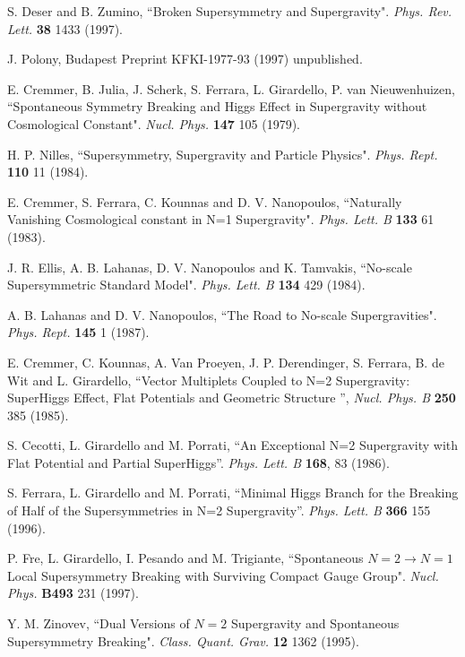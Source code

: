 \documentclass[a4paper,12pt]{article}
\begin{document}
\begin{thebibliography}{99}

 S. Deser and B. Zumino, ``Broken Supersymmetry and Supergravity". {\it Phys. Rev.
Lett.} {\bf 38} 1433 (1997).

 J. Polony, Budapest Preprint KFKI-1977-93 (1997) unpublished.

 E. Cremmer, B. Julia, J. Scherk, S. Ferrara, L. Girardello, P. van
Nieuwenhuizen, ``Spontaneous Symmetry Breaking and Higgs Effect in Supergravity without
Cosmological Constant". {\it Nucl. Phys.} {\bf 147} 105 (1979).


 H. P. Nilles, ``Supersymmetry, Supergravity and Particle Physics". {\it Phys.
Rept.} {\bf 110} 11 (1984).



E. Cremmer, S. Ferrara, C. Kounnas and D. V. Nanopoulos, ``Naturally Vanishing Cosmological
constant in N=1 Supergravity".
{\it Phys. Lett. B} {\bf 133} 61 (1983).

J. R. Ellis, A. B. Lahanas, D. V. Nanopoulos and K. Tamvakis, ``No-scale Supersymmetric
Standard Model". {\it  Phys. Lett. B }
{\bf 134} 429 (1984).

 A. B. Lahanas and D. V. Nanopoulos, ``The Road to No-scale Supergravities". {\it
Phys. Rept.} {\bf 145} 1 (1987).

E. Cremmer, C. Kounnas, A. Van Proeyen, J. P. Derendinger, S.
Ferrara, B. de Wit and L. Girardello, ``Vector Multiplets Coupled
to N=2 Supergravity: SuperHiggs Effect, Flat Potentials and
Geometric Structure '', {\it  Nucl. Phys. B} {\bf 250} 385 (1985).

S. Cecotti, L. Girardello and M. Porrati, ``An Exceptional N=2
Supergravity with Flat Potential and Partial SuperHiggs''. {\it
Phys. Lett. B} {\bf 168}, 83 (1986).



S. Ferrara, L. Girardello and M. Porrati, ``Minimal Higgs Branch
for the Breaking of Half of the Supersymmetries in N=2
Supergravity''. {\it Phys. Lett. B} {\bf 366}  155 (1996).

P. Fre, L. Girardello, I. Pesando and M. Trigiante, ``Spontaneous $N=2\rightarrow N=1$ Local
Supersymmetry Breaking with Surviving Compact Gauge Group". {\it Nucl. Phys.} {\bf B493}  231
(1997).

 Y. M. Zinovev, ``Dual Versions of $N=2$ Supergravity and Spontaneous
Supersymmetry Breaking". {\it Class. Quant. Grav.} {\bf 12} 1362 (1995).


\end{thebibliography}
\end{document}
